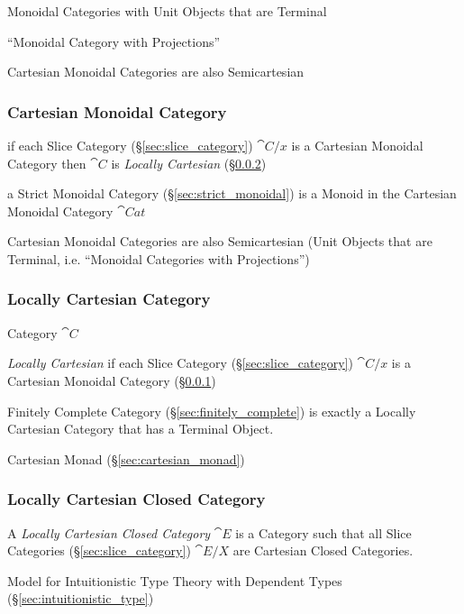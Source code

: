 Monoidal Categories with Unit Objects that are Terminal

``Monoidal Category with Projections''

Cartesian Monoidal Categories are also Semicartesian



\subsubsection{Cartesian Monoidal Category}
\label{sec:cartesian_monoidal}

if each Slice Category (\S\ref{sec:slice_category}) $\cat{C}/x$ is a
Cartesian Monoidal Category then $\cat{C}$ is \emph{Locally Cartesian}
(\S\ref{sec:locally_cartesian})

a Strict Monoidal Category (\S\ref{sec:strict_monoidal}) is a Monoid
in the Cartesian Monoidal Category $\cat{Cat}$

Cartesian Monoidal Categories are also Semicartesian (Unit Objects
that are Terminal, i.e. ``Monoidal Categories with Projections'')



\subsubsection{Locally Cartesian Category}\label{sec:locally_cartesian}

Category $\cat{C}$

\emph{Locally Cartesian} if each Slice Category
(\S\ref{sec:slice_category}) $\cat{C}/x$ is a Cartesian Monoidal
Category (\S\ref{sec:cartesian_monoidal})

Finitely Complete Category (\S\ref{sec:finitely_complete}) is exactly
a Locally Cartesian Category that has a Terminal Object.

Cartesian Monad (\S\ref{sec:cartesian_monad})



\subsubsection{Locally Cartesian Closed Category}
\label{sec:locally_cartesian_closed}

A \emph{Locally Cartesian Closed Category} $\cat{E}$ is a Category
such that all Slice Categories (\S\ref{sec:slice_category})
$\cat{E}/X$ are Cartesian Closed Categories.

Model for Intuitionistic Type Theory with Dependent Types
(\S\ref{sec:intuitionistic_type})

